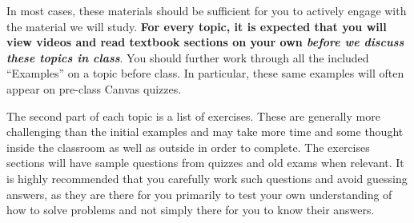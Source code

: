\documentclass{ximera}
\begin{document}
 In most cases, these materials should be sufficient for you to actively engage with the material we will study. \textbf{For every topic, it is expected that you will view videos and read textbook sections on your own \textit{before we discuss these topics in class}}. You should further work through all the included ``Examples'' on a topic before class. In particular, these same examples will often appear on pre-class Canvas quizzes.
 
 The second part of each topic is a list of exercises. These are generally more challenging than the initial examples and may take more time and some thought inside the classroom as well as outside in order to complete. The exercises sections will have sample questions from quizzes and old exams when relevant. It is highly recommended that you carefully work such questions and avoid guessing answers, as they are there for you primarily to test your own understanding of how to solve problems and not simply there for you to know their answers.

 
\end{document}
